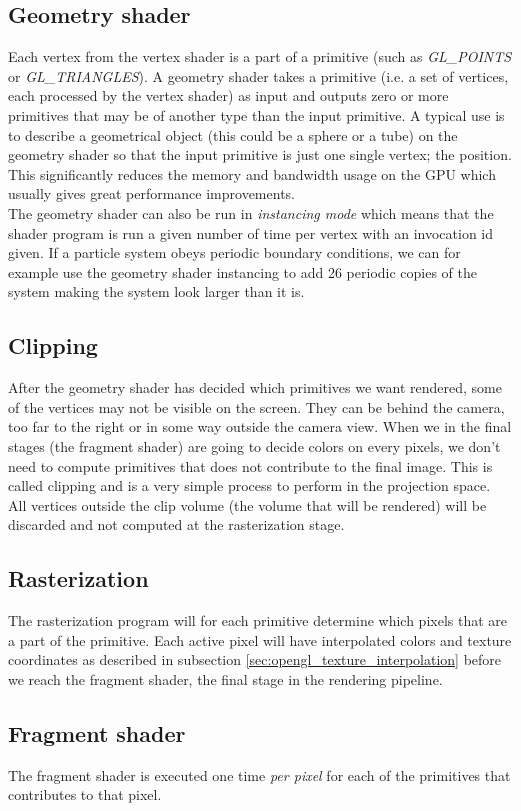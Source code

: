 \subsection{Geometry shader}
Each vertex from the vertex shader is a part of a primitive (such as \textit{GL\_POINTS} or \textit{GL\_TRIANGLES}). A geometry shader takes a primitive (i.e. a set of vertices, each processed by the vertex shader) as input and outputs zero or more primitives that may be of another type than the input primitive. A typical use is to describe a geometrical object (this could be a sphere or a tube) on the geometry shader so that the input primitive is just one single vertex; the position. This significantly reduces the memory and bandwidth usage on the GPU which usually gives great performance improvements.\\
The geometry shader can also be run in \textit{instancing mode} which means that the shader program is run a given number of time per vertex with an invocation id given. If a particle system obeys periodic boundary conditions, we can for example use the geometry shader instancing to add 26 periodic copies of the system making the system look larger than it is. 
\subsection{Clipping}
After the geometry shader has decided which primitives we want rendered, some of the vertices may not be visible on the screen. They can be behind the camera, too far to the right or in some way outside the camera view. When we in the final stages (the fragment shader) are going to decide colors on every pixels, we don't need to compute primitives that does not contribute to the final image. This is called clipping and is a very simple process to perform in the projection space. All vertices outside the clip volume (the volume that will be rendered) will be discarded and not computed at the rasterization stage.
\subsection{Rasterization}
The rasterization program will for each primitive determine which pixels that are a part of the primitive. Each active pixel will have interpolated colors and texture coordinates as described in subsection \ref{sec:opengl_texture_interpolation} before we reach the fragment shader, the final stage in the rendering pipeline.
\subsection{Fragment shader}
The fragment shader is executed one time \textit{per pixel} for each of the primitives that contributes to that pixel. 